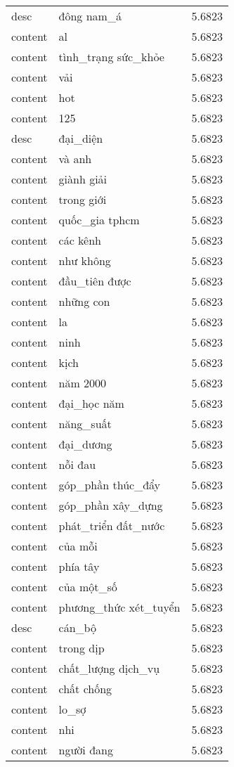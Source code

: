 \documentclass{article}
\begin{document}
\begin{tabular}{lll}
desc & đông nam\_á & 5.6823\\
content & al & 5.6823\\
content & tình\_trạng sức\_khỏe & 5.6823\\
content & vải & 5.6823\\
content & hot & 5.6823\\
content & 125 & 5.6823\\
desc & đại\_diện & 5.6823\\
content & và anh & 5.6823\\
content & giành giải & 5.6823\\
content & trong giới & 5.6823\\
content & quốc\_gia tphcm & 5.6823\\
content & các kênh & 5.6823\\
content & như không & 5.6823\\
content & đầu\_tiên được & 5.6823\\
content & những con & 5.6823\\
content & la & 5.6823\\
content & ninh & 5.6823\\
content & kịch & 5.6823\\
content & năm 2000 & 5.6823\\
content & đại\_học năm & 5.6823\\
content & năng\_suất & 5.6823\\
content & đại\_dương & 5.6823\\
content & nỗi đau & 5.6823\\
content & góp\_phần thúc\_đẩy & 5.6823\\
content & góp\_phần xây\_dựng & 5.6823\\
content & phát\_triển đất\_nước & 5.6823\\
content & của mỗi & 5.6823\\
content & phía tây & 5.6823\\
content & của một\_số & 5.6823\\
content & phương\_thức xét\_tuyển & 5.6823\\
desc & cán\_bộ & 5.6823\\
content & trong dịp & 5.6823\\
content & chất\_lượng dịch\_vụ & 5.6823\\
content & chất chống & 5.6823\\
content & lo\_sợ & 5.6823\\
content & nhi & 5.6823\\
content & người đang & 5.6823\\

\end{tabular}
\end{document}
